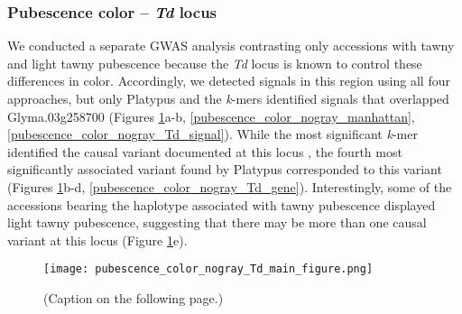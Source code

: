 \subsubsection{Pubescence color -- \textit{Td} locus}
\label{sv-gwas-main-results-pubescence-color-td}

We conducted a separate GWAS analysis contrasting only accessions with tawny and light
tawny pubescence because the \textit{Td} locus is known to control
these differences in color. Accordingly, we
detected signals in this region using all four approaches, but only Platypus
and the \textit{k}-mers identified signals that overlapped Glyma.03g258700
(Figures \ref{pubescence-color-main-figure}a-b,
\ref{pubescence_color_nogray_manhattan}, \ref{pubescence_color_nogray_Td_signal}).
While the most significant \textit{k}-mer identified the causal variant documented
at this locus \citep{yan2020}, the fourth most significantly associated variant
found by Platypus corresponded to this variant (Figures
\ref{pubescence-color-main-figure}b-d, \ref{pubescence_color_nogray_Td_gene}).
Interestingly, some of the accessions bearing the haplotype associated with tawny pubescence
displayed light tawny pubescence, suggesting that there may be more than one causal
variant at this locus (Figure \ref{pubescence-color-main-figure}e).

\begin{figure}
	\centering
	\texttt{[image: pubescence\_color\_nogray\_Td\_main\_figure.png]}
	\caption[Results of SNP/indel- and \textit{k}-mer-based GWAS at the
	\textit{Td} locus for pubescence color]{(Caption on the following page.)}
	\label{pubescence-color-main-figure}
\end{figure}

